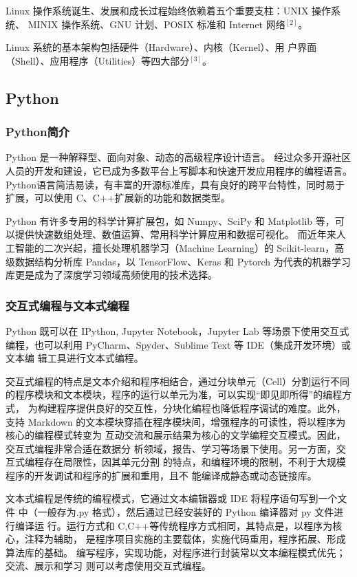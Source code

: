 \documentclass[10pt,a4paper,twoside,UTF8]{ctexart}
\begin{document}
Linux 操作系统诞生、发展和成长过程始终依赖着五个重要支柱：UNIX 操作系统、
MINIX 操作系统、GNU 计划、POSIX 标准和 Internet 网络$^{[2]}$。

Linux 系统的基本架构包括硬件（Hardware）、内核（Kernel）、用
户界面（Shell）、应用程序（Utilities）等四大部分$^{[3]}$。

\subsection{Python}
\subsubsection{Python简介}
Python 是一种解释型、面向对象、动态的高级程序设计语言。
经过众多开源社区人员的开发和建设，它已成为多数平台上写脚本和快速开发应用程序的编程语言。
Python语言简洁易读，有丰富的开源标准库，具有良好的跨平台特性，同时易于扩展，可以使用 C、C++扩展新的功能和数据类型。

Python 有许多专用的科学计算扩展包，如 Numpy、SciPy 和 Matplotlib 等，可以提供快速数组处理、数值运算、常用科学计算应用和数据可视化。
而近年来人工智能的二次兴起，擅长处理机器学习（Machine Learning）的 Scikit-learn，高级数据结构分析库 Pandas，以 TensorFlow、Keras 和 Pytorch 为代表的机器学习库更是成为了深度学习领域高频使用的技术选择。

\subsubsection{交互式编程与文本式编程} 
Python 既可以在 IPython, Jupyter Notebook，Jupyter Lab 等场景下使用交互式
编程，也可以利用 PyCharm、Spyder、Sublime Text 等 IDE（集成开发环境）或文本编
辑工具进行文本式编程。

交互式编程的特点是文本介绍和程序相结合，通过分块单元（Cell）分割运行不同
的程序模块和文本模块，程序的运行以单元为准，可以实现“即见即所得”的编程方式，
为构建程序提供良好的交互性，分块化编程也降低程序调试的难度。此外，支持 Markdown
的文本模块穿插在程序模块间，增强程序的可读性，将以程序为核心的编程模式转变为
互动交流和展示结果为核心的文学编程交互模式。因此，交互式编程非常合适在数据分
析领域，报告、学习等场景下使用。另一方面，交互式编程存在局限性，因其单元分割
的特点，和编程环境的限制，不利于大规模程序的开发调试和程序的扩展和重用，且不
能编译成静态或动态链接库。

文本式编程是传统的编程模式，它通过文本编辑器或 IDE 将程序语句写到一个文件
中（一般存为.py 格式），然后通过已经安装好的 Python 编译器对 py 文件进行编译运
行。运行方式和 C,C++等传统程序方式相同，其特点是，以程序为核心，注释为辅助，
是程序项目实施的主要载体，实施代码重用，程序拓展、形成算法库的基础。
编写程序，实现功能，对程序进行封装常以文本编程模式优先；交流、展示和学习
则可以考虑使用交互式编程。
\end{document}
